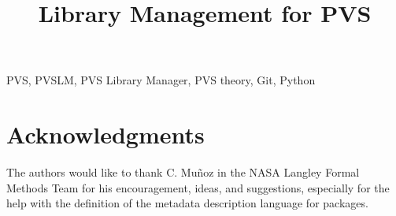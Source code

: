 \documentclass[journal,comsoc]{IEEEtran}
\begin{document}

\title{Library Management for PVS}


\author{
}

\maketitle



\begin{IEEEkeywords}
PVS, PVSLM, PVS Library Manager, PVS theory, Git, Python
\end{IEEEkeywords}

\IEEEpeerreviewmaketitle













\section*{Acknowledgments}
The authors would like to thank C. Mu\~noz in the NASA Langley Formal
Methods Team for his encouragement, ideas, and suggestions, especially
for the help with the definition of the metadata description language
for packages.

\ifCLASSOPTIONcaptionsoff
  \newpage
\fi



\end{document}
